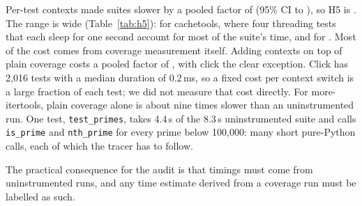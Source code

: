 Per-test contexts made suites slower by a pooled factor of \HFiveRatio{} (95\% CI \HFiveLo{} to \HFiveHi{}), so H5 is \textbf{\HFiveSupported}. The range is wide (Table~\ref{tab:h5}): \HFiveMin{} for cachetools, where four threading tests that each sleep for one second account for most of the suite's time, and \HFiveMax{} for \HFiveMaxProject{}. Most of the cost comes from coverage measurement itself. Adding contexts on top of plain coverage costs a pooled factor of \HFiveCtxCov{}, with click the clear exception. Click has 2,016 tests with a median duration of 0.2\,ms, so a fixed cost per context switch is a large fraction of each test; we did not measure that cost directly. For more-itertools, plain coverage alone is about nine times slower than an uninstrumented run. One test, \texttt{test\_primes}, takes 4.4\,s of the 8.3\,s uninstrumented suite and calls \texttt{is\_prime} and \texttt{nth\_prime} for every prime below 100,000: many short pure-Python calls, each of which the tracer has to follow.

The practical consequence for the audit is that timings must come from uninstrumented runs, and any time estimate derived from a coverage run must be labelled as such.




